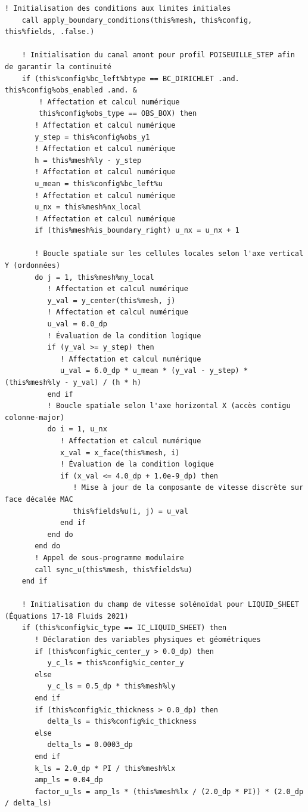 \documentclass[10pt,a4paper,oneside]{book}
\begin{document}
\begin{lstlisting}[language={[95]Fortran}]
    ! Initialisation des conditions aux limites initiales
    call apply_boundary_conditions(this%mesh, this%config, this%fields, .false.)

    ! Initialisation du canal amont pour profil POISEUILLE_STEP afin de garantir la continuité
    if (this%config%bc_left%btype == BC_DIRICHLET .and. this%config%obs_enabled .and. &
        ! Affectation et calcul numérique
        this%config%obs_type == OBS_BOX) then
       ! Affectation et calcul numérique
       y_step = this%config%obs_y1
       ! Affectation et calcul numérique
       h = this%mesh%ly - y_step
       ! Affectation et calcul numérique
       u_mean = this%config%bc_left%u
       ! Affectation et calcul numérique
       u_nx = this%mesh%nx_local
       ! Affectation et calcul numérique
       if (this%mesh%is_boundary_right) u_nx = u_nx + 1

       ! Boucle spatiale sur les cellules locales selon l'axe vertical Y (ordonnées)
       do j = 1, this%mesh%ny_local
          ! Affectation et calcul numérique
          y_val = y_center(this%mesh, j)
          ! Affectation et calcul numérique
          u_val = 0.0_dp
          ! Évaluation de la condition logique
          if (y_val >= y_step) then
             ! Affectation et calcul numérique
             u_val = 6.0_dp * u_mean * (y_val - y_step) * (this%mesh%ly - y_val) / (h * h)
          end if
          ! Boucle spatiale selon l'axe horizontal X (accès contigu colonne-major)
          do i = 1, u_nx
             ! Affectation et calcul numérique
             x_val = x_face(this%mesh, i)
             ! Évaluation de la condition logique
             if (x_val <= 4.0_dp + 1.0e-9_dp) then
                ! Mise à jour de la composante de vitesse discrète sur face décalée MAC
                this%fields%u(i, j) = u_val
             end if
          end do
       end do
       ! Appel de sous-programme modulaire
       call sync_u(this%mesh, this%fields%u)
    end if

    ! Initialisation du champ de vitesse solénoïdal pour LIQUID_SHEET (Équations 17-18 Fluids 2021)
    if (this%config%ic_type == IC_LIQUID_SHEET) then
       ! Déclaration des variables physiques et géométriques
       if (this%config%ic_center_y > 0.0_dp) then
          y_c_ls = this%config%ic_center_y
       else
          y_c_ls = 0.5_dp * this%mesh%ly
       end if
       if (this%config%ic_thickness > 0.0_dp) then
          delta_ls = this%config%ic_thickness
       else
          delta_ls = 0.0003_dp
       end if
       k_ls = 2.0_dp * PI / this%mesh%lx
       amp_ls = 0.04_dp
       factor_u_ls = amp_ls * (this%mesh%lx / (2.0_dp * PI)) * (2.0_dp / delta_ls)


\end{lstlisting}
\end{document}
